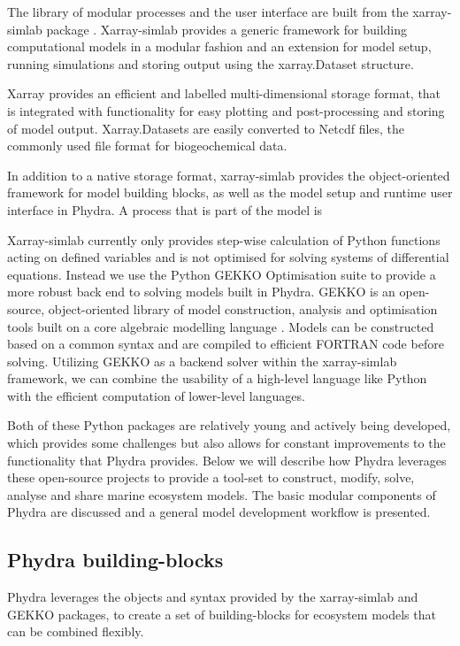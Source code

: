 \documentclass[template.tex]{subfiles}
\begin{document}
The library of modular processes and the user interface are built from the xarray-simlab package \citep{Bovy2018Xarray-simlab:Interactively}. 
Xarray-simlab provides a generic framework for building computational models in a modular fashion and an extension for model setup, running simulations and storing output using the xarray.Dataset structure.

Xarray provides an efficient and labelled multi-dimensional storage format, that is integrated with functionality for easy plotting and post-processing and storing of model output. Xarray.Datasets are easily converted to Netcdf files, the commonly used file format for biogeochemical data. 

In addition to a native storage format, xarray-simlab provides the object-oriented framework for model building blocks, as well as the model setup and runtime user interface in Phydra. A process that is part of the model is 

Xarray-simlab currently only provides step-wise calculation of Python functions acting on defined variables and is not optimised for solving systems of differential equations. Instead we use the Python GEKKO Optimisation suite to provide a more robust back end to solving models built in Phydra. GEKKO is an open-source, object-oriented library of model construction, analysis and optimisation tools built on a core algebraic modelling language \citep{Beal2018GEKKOSuite}. Models can be constructed based on a common syntax and are compiled to efficient FORTRAN code before solving.
Utilizing GEKKO as a backend solver within the xarray-simlab framework, we can combine the usability of a high-level language like Python with the efficient computation of lower-level languages.

Both of these Python packages are relatively young and actively being developed, which provides some challenges but also allows for constant improvements to the functionality that Phydra provides.
Below we will describe how Phydra leverages these open-source projects to provide a tool-set to construct, modify, solve, analyse and share marine ecosystem models. The basic modular components of Phydra are discussed and a general model development workflow is presented.


\subsection{Phydra building-blocks}

Phydra leverages the objects and syntax provided by the xarray-simlab and GEKKO packages, to create a set of building-blocks for ecosystem models that can be combined flexibly. 
\end{document}
